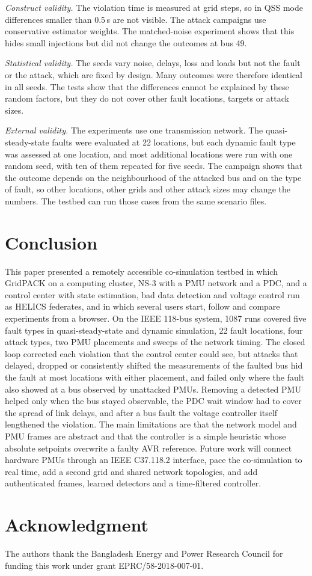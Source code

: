 \documentclass[journal]{IEEEtran}
\begin{document}
\emph{Construct validity.} The violation time is measured at grid steps, so in QSS mode differences smaller than 0.5\,s are not visible. The attack campaigns use conservative estimator weights. The matched-noise experiment shows that this hides small injections but did not change the outcomes at bus 49.

\emph{Statistical validity.} The seeds vary noise, delays, loss and loads but not the fault or the attack, which are fixed by design. Many outcomes were therefore identical in all seeds. The tests show that the differences cannot be explained by these random factors, but they do not cover other fault locations, targets or attack sizes.

\emph{External validity.} The experiments use one transmission network. The quasi-steady-state faults were evaluated at 22 locations, but each dynamic fault type was assessed at one location, and most additional locations were run with one random seed, with ten of them repeated for five seeds. The campaign shows that the outcome depends on the neighbourhood of the attacked bus and on the type of fault, so other locations, other grids and other attack sizes may change the numbers. The testbed can run those cases from the same scenario files.

\section{Conclusion}
\label{sec:concl}

This paper presented a remotely accessible co-simulation testbed in which GridPACK on a computing cluster, NS-3 with a PMU network and a PDC, and a control center with state estimation, bad data detection and voltage control run as HELICS federates, and in which several users start, follow and compare experiments from a browser. On the IEEE 118-bus system, 1087 runs covered five fault types in quasi-steady-state and dynamic simulation, 22 fault locations, four attack types, two PMU placements and sweeps of the network timing. The closed loop corrected each violation that the control center could see, but attacks that delayed, dropped or consistently shifted the measurements of the faulted bus hid the fault at most locations with either placement, and failed only where the fault also showed at a bus observed by unattacked PMUs. Removing a detected PMU helped only when the bus stayed observable, the PDC wait window had to cover the spread of link delays, and after a bus fault the voltage controller itself lengthened the violation. The main limitations are that the network model and PMU frames are abstract and that the controller is a simple heuristic whose absolute setpoints overwrite a faulty AVR reference. Future work will connect hardware PMUs through an IEEE C37.118.2 interface, pace the co-simulation to real time, add a second grid and shared network topologies, and add authenticated frames, learned detectors and a time-filtered controller.

\section*{Acknowledgment}

The authors thank the Bangladesh Energy and Power Research Council for funding this work under grant EPRC/58-2018-007-01.



\end{document}
